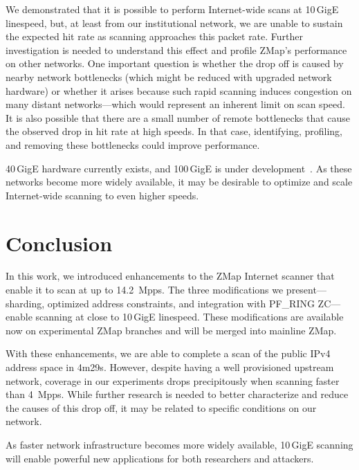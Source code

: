 We demonstrated that it is possible to perform Internet-wide scans at
10\,GigE linespeed, but, at least from our institutional network, we are
unable to sustain the expected hit rate as scanning approaches this packet
rate. Further investigation is needed to understand this effect and profile
ZMap's performance on other networks. One important question is whether the
drop off is caused by nearby network bottlenecks (which might be reduced with
upgraded network hardware) or whether it arises because such rapid scanning
induces congestion on many distant networks---which would represent an
inherent limit on scan speed. It is also possible that there are a small
number of remote bottlenecks that cause the observed drop in hit rate at high
speeds. In that case, identifying, profiling, and removing these bottlenecks
could improve performance.

40\,GigE hardware currently exists, and 100\,GigE is under
development~\cite{hundred-gig}. As these networks become more widely
available, it may be desirable to optimize and scale Internet-wide scanning
to even higher speeds.

\section{Conclusion}

In this work, we introduced enhancements to the ZMap Internet scanner that
enable it to scan at up to 14.2~Mpps. The three modifications we
present---sharding, optimized address constraints, and integration with
PF\_RING ZC---enable scanning at close to 10\,GigE linespeed. These
modifications are available now on experimental ZMap branches and will be
merged into mainline ZMap.

With these enhancements, we are able to complete a scan of the public IPv4
address space in 4m29s. However, despite having a well provisioned upstream
network, coverage in our experiments drops precipitously when scanning faster
than 4~Mpps. While further research is needed to better characterize and
reduce the causes of this drop off, it may be related to specific conditions
on our network.

As faster network infrastructure becomes more widely available, 10\,GigE
scanning will enable powerful new applications for both researchers and
attackers.

